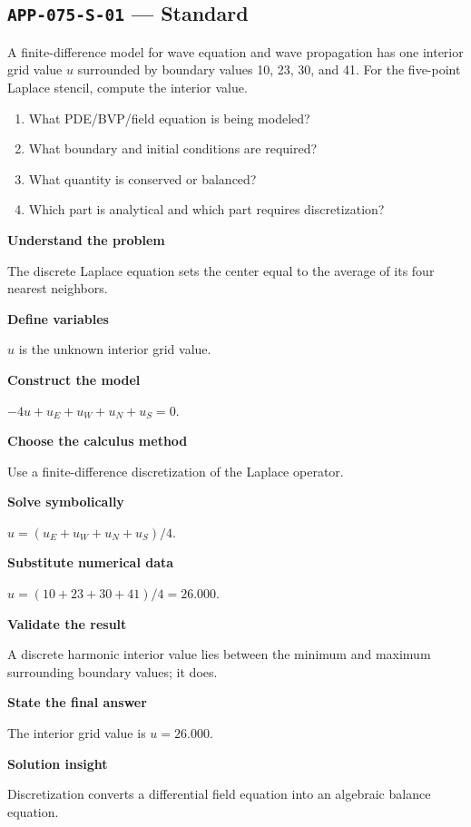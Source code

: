 \documentclass[11pt]{book}
\newcommand{\pid}[1]{\texttt{#1}}
\begin{document}
\subsection*{\pid{APP-075-S-01} — Standard}
\begin{problembox}
A finite-difference model for wave equation and wave propagation has one interior grid value $u$ surrounded by boundary values 10, 23, 30, and 41. For the five-point Laplace stencil, compute the interior value.
\end{problembox}
\begin{promptbox}\begin{enumerate}
\item What PDE/BVP/field equation is being modeled?
\item What boundary and initial conditions are required?
\item What quantity is conserved or balanced?
\item Which part is analytical and which part requires discretization?
\end{enumerate}\end{promptbox}
\begin{solutionbox}
\textbf{Understand the problem}\par The discrete Laplace equation sets the center equal to the average of its four nearest neighbors.\par\medskip
\textbf{Define variables}\par $u$ is the unknown interior grid value.\par\medskip
\textbf{Construct the model}\par $-4u+u_E+u_W+u_N+u_S=0$.\par\medskip
\textbf{Choose the calculus method}\par Use a finite-difference discretization of the Laplace operator.\par\medskip
\textbf{Solve symbolically}\par $u=(u_E+u_W+u_N+u_S)/4$.\par\medskip
\textbf{Substitute numerical data}\par $u=(10+23+30+41)/4=26.000$.\par\medskip
\textbf{Validate the result}\par A discrete harmonic interior value lies between the minimum and maximum surrounding boundary values; it does.\par\medskip
\textbf{State the final answer}\par The interior grid value is $u=26.000$.\par\medskip
\textbf{Solution insight}\par Discretization converts a differential field equation into an algebraic balance equation.\par\medskip
\end{solutionbox}
\end{document}

